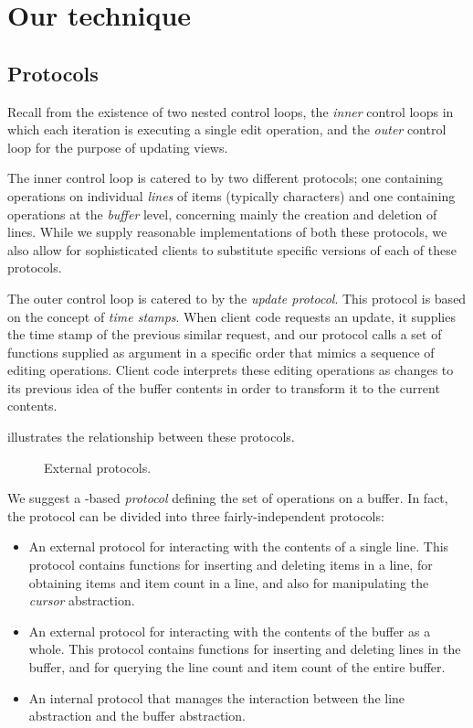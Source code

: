 \section{Our technique}

\subsection{Protocols}

Recall from  the existence of two nested
control loops, the \emph{inner} control loops in which each iteration
is executing a single edit operation, and the \emph{outer} control
loop for the purpose of updating views.

The inner control loop is catered to by two different protocols; one
containing operations on individual \emph{lines} of items (typically
characters) and one containing operations at the \emph{buffer} level,
concerning mainly the creation and deletion of lines.  While we supply
reasonable implementations of both these protocols, we also allow for
sophisticated clients to substitute specific versions of each of these
protocols.

The outer control loop is catered to by the \emph{update protocol}.
This protocol is based on the concept of \emph{time stamps}.  When
client code requests an update, it supplies the time stamp of the
previous similar request, and our protocol calls a set of functions
supplied as argument in a specific order that mimics a sequence of
editing operations.  Client code interprets these editing operations
as changes to its previous idea of the buffer contents in order to
transform it to the current contents.

 illustrates the relationship between
these protocols.

\begin{figure}
\begin{center}
\end{center}
\caption{\label{fig-external-protocols}
External protocols.}
\end{figure}

We suggest a \clos{}-based \emph{protocol} defining the set of
operations on a buffer.  In fact, the protocol can be divided into
three fairly-independent protocols:

\begin{itemize}
\item An external protocol for interacting with the contents of a
  single line.  This protocol contains functions for inserting and
  deleting items in a line, for obtaining items and item count in a
  line, and also for manipulating the \emph{cursor} abstraction.
\item An external protocol for interacting with the contents of the
  buffer as a whole.  This protocol contains functions for inserting
  and deleting lines in the buffer, and for querying the line count
  and item count of the entire buffer.
\item An internal protocol that manages the interaction between the
  line abstraction and the buffer abstraction.
\end{itemize}

